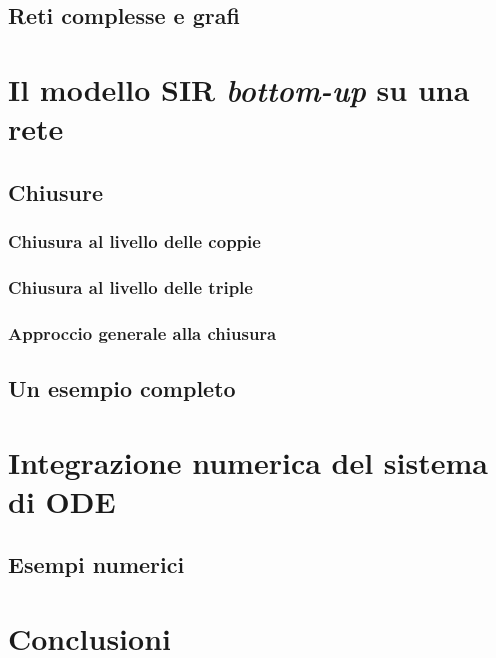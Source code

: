 \documentclass[12pt,a4paper,twoside]{report}
\begin{document}


\section{Reti complesse e grafi}

\lipsum[6-10]

\chapter{Il modello SIR \textit{bottom-up} su una rete}

\lipsum[6-10]

\section{Chiusure}

\lipsum[6-10]

\subsection{Chiusura al livello delle coppie}

\lipsum[6-10]

\subsection{Chiusura al livello delle triple}

\lipsum[6-10]

\subsection{Approccio generale alla chiusura}

\lipsum[6-10]

\section{Un esempio completo}

\lipsum[6-10]

\chapter{Integrazione numerica del sistema di ODE}\label{ode}

\lipsum[6-7]

\section{Esempi numerici}

\lipsum[8-10]

\chapter*{Conclusioni}

\lipsum[11-14]




\cleardoublepage
\listoffigures
{}
\listoftables
{}
\tableofcontents
\end{document}
